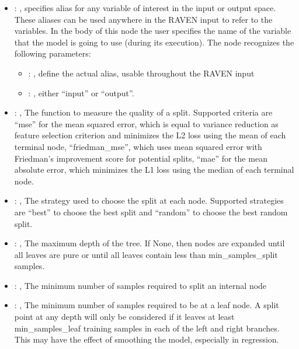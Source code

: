 \begin{itemize}
    \item {}: , 
      specifies alias for         any variable of interest in the input or output space. These
      aliases can be used anywhere in the RAVEN input to         refer to the variables. In the body
      of this node the user specifies the name of the variable that the model is going to use
      (during its execution).
      The  node recognizes the following parameters:
        \begin{itemize}
          \item {}: , 
            define the actual alias, usable throughout the RAVEN input
          \item {}: , 
            either ``input'' or ``output''.
      \end{itemize}

    \item {}: , 
      The function to measure the quality of a split. Supported criteria are ``mse'' for the mean
      squared error,                                                  which is equal to variance
      reduction as feature selection criterion and minimizes the L2 loss using the mean of each
      terminal node, ``friedman\_mse'', which uses mean squared error with Friedman's improvement
      score for potential splits,                                                  ``mae'' for the
      mean absolute error, which minimizes the L1 loss using the median of each terminal node.

    \item {}: , 
      The strategy used to choose the split at each node. Supported strategies are ``best''
      to choose the best split and ``random'' to choose the best random split.

    \item {}: , 
      The maximum depth of the tree. If None, then nodes are expanded until all leaves are pure
      or until all leaves contain less than min\_samples\_split samples.

    \item {}: , 
      The minimum number of samples required to split an internal node

    \item {}: , 
      The minimum number of samples required to be at a leaf node. A split point at any
      depth will only be considered if it leaves at least min\_samples\_leaf training samples in
      each                                                  of the left and right branches. This may
      have the effect of smoothing the model, especially
      in regression.


\end{itemize}
